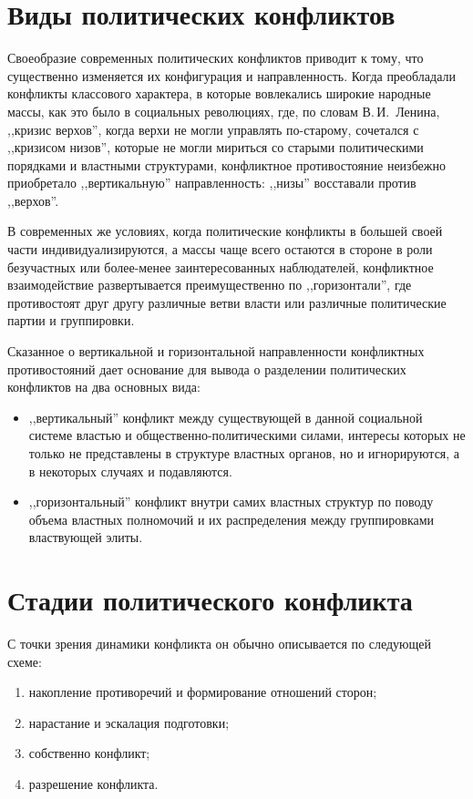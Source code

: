 \documentclass[a4paper,12pt,notitlepage,pdftex,headsepline]{scrartcl}
\begin{document}
  \clearpage
\section{Виды политических конфликтов}
  Своеобразие современных политических конфликтов приводит к тому, что
  существенно изменяется их конфигурация и направленность.
  Когда преобладали конфликты классового характера, в которые вовлекались
  широкие народные массы, как это было в социальных революциях, где, по словам
  В.\,И.~Ленина, ,,кризис верхов'', когда верхи не могли управлять по-старому,
  сочетался с ,,кризисом низов'', которые не могли мириться со старыми
  политическими порядками и властными структурами, конфликтное противостояние
  неизбежно приобретало ,,вертикальную'' направленность: ,,низы'' восставали
  против ,,верхов''.

  В современных же условиях, когда политические конфликты в большей своей
  части индивидуализируются, а массы чаще всего остаются в стороне в роли
  безучастных или более-менее заинтересованных наблюдателей, конфликтное
  взаимодействие развертывается преимущественно по ,,горизонтали'', где
  противостоят друг другу различные ветви власти или различные политические
  партии и группировки.

  Сказанное о вертикальной и горизонтальной направленности конфликтных
  противостояний дает основание для вывода о разделении политических
  конфликтов на два основных вида:
  \begin{itemize}
    \item ,,вертикальный'' конфликт между существующей в данной социальной
      системе властью и общественно-политическими силами, интересы которых не
      только не представлены в структуре властных органов, но и игнорируются,
      а в некоторых случаях и подавляются.
    \item ,,горизонтальный'' конфликт внутри самих властных структур по поводу
      объема властных полномочий и их распределения между группировками
      властвующей элиты.
  \end{itemize}

  \clearpage
\section{Стадии политического конфликта}
  С точки зрения динамики конфликта он обычно описывается по следующей схеме:
  \begin{enumerate}
    \item накопление противоречий и формирование отношений сторон;
    \item нарастание и эскалация подготовки;
    \item собственно конфликт;
    \item разрешение конфликта.
  \end{enumerate}
\end{document}
